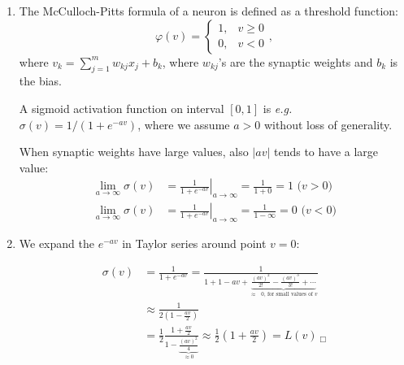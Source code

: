 \begin{enumerate}
  \begin{solution}

    \begin{enumerate}
      
    \item The McCulloch-Pitts formula of a neuron is
      defined as a threshold function:
      \begin{equation}
        \varphi(v) = \left\{ \begin{array}{rl} 1, & v \geq 0 \\ 0, & v <
            0 \end{array} \right.,
      \end{equation}
      where $v_k = \sum_{j=1}^{m} w_{kj} x_j + b_k$, where $w_{kj}$'s are
      the synaptic weights and $b_k$ is the bias.
      
      A sigmoid activation function on interval $[0,1]$ is {\em e.g.}
      $\sigma(v) = 1 / (1 + e^{-av})$, where we assume $a > 0$ without
      loss of generality.
      
      When synaptic weights have large values, also $|a v|$ tends to have
      a large value:
      \begin{equation}
        \begin{aligned}
          \lim_{a \rightarrow \infty} \sigma(v)& = \left. \frac{1}{1 +
              e^{-av}}\right|_{a \rightarrow \infty} = \frac{1}{1+0} = 1 \mbox{\ \ \ \ \ \ ($v>0$)}
          \\
          \lim_{a \rightarrow \infty} \sigma(v)& = \left. \frac{1}{1 +
              e^{-av}}\right|_{a \rightarrow \infty} =
          \frac{1}{1-\infty} = 0 \mbox{\ \ \ \ \ ($v<0$)}
        \end{aligned}
      \end{equation}
      
    \item We expand the $e^{-av}$ in Taylor series around point $v=0$:
      
      \begin{equation}
        \begin{split}
          \sigma(v) &= \frac{1}{1 + e^{-av}} = \frac{1}{1 + 1 - av +
            \underbrace{\frac{(av)^2}{2!} - \frac{(av)^3}{3!} +
              \cdots}_{\mbox{$\approx$ $0$, for small values of $v$}}} \\ 
          &\approx \frac{1}{2 ( 1 - \frac{av}{2})} \\
          &= \frac{1}{2} \frac{1 + \frac{av}{2}} {1 -
            \underbrace{\frac{(av)^2}{4}}_{\approx 0}} \approx \frac{1}{2}
          \left(1 + \frac{av}{2} \right) = L(v) \: _\Box
        \end{split}
      \end{equation}
      

\end{enumerate}
\end{solution}
\end{enumerate}
